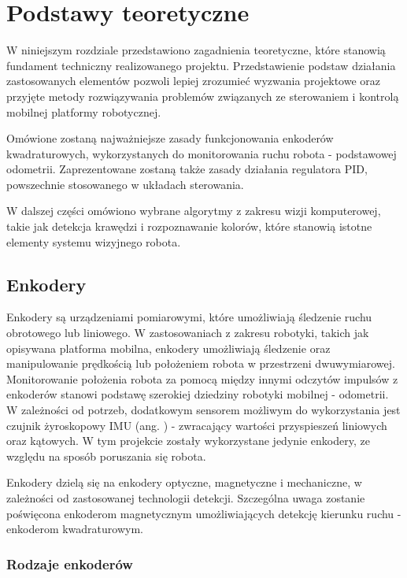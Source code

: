 \chapter{Podstawy teoretyczne}
\label{ch:podstawy-teoretyczne}

W niniejszym rozdziale przedstawiono zagadnienia teoretyczne, które stanowią fundament techniczny realizowanego projektu. Przedstawienie podstaw działania zastosowanych elementów pozwoli lepiej zrozumieć wyzwania projektowe oraz przyjęte metody rozwiązywania problemów związanych ze sterowaniem i kontrolą mobilnej platformy robotycznej.

Omówione zostaną najważniejsze zasady funkcjonowania enkoderów kwadraturowych, wykorzystanych do monitorowania ruchu robota - podstawowej odometrii. Zaprezentowane zostaną także zasady działania regulatora PID, powszechnie stosowanego w układach sterowania.

W dalszej części omówiono wybrane algorytmy z zakresu wizji komputerowej, takie jak detekcja krawędzi i rozpoznawanie kolorów, które stanowią istotne elementy systemu wizyjnego robota.

\section{Enkodery}
Enkodery są urządzeniami pomiarowymi, które umożliwiają śledzenie ruchu obrotowego lub liniowego. W zastosowaniach z zakresu robotyki, takich jak opisywana platforma mobilna, enkodery umożliwiają śledzenie oraz manipulowanie prędkością lub położeniem robota w przestrzeni dwuwymiarowej. Monitorowanie położenia robota za pomocą między innymi odczytów impulsów z enkoderów stanowi podstawę szerokiej dziedziny robotyki mobilnej - odometrii. W zależności od potrzeb, dodatkowym sensorem możliwym do wykorzystania jest czujnik żyroskopowy IMU (ang. ) - zwracający wartości przyspieszeń liniowych oraz kątowych. W tym projekcie zostały wykorzystane jedynie enkodery, ze względu na sposób poruszania się robota. 

Enkodery dzielą się na enkodery optyczne, magnetyczne i mechaniczne, w zależności od zastosowanej technologii detekcji. Szczególna uwaga zostanie poświęcona enkoderom magnetycznym umożliwiających detekcję kierunku ruchu - enkoderom kwadraturowym. 

\subsection{Rodzaje enkoderów}

